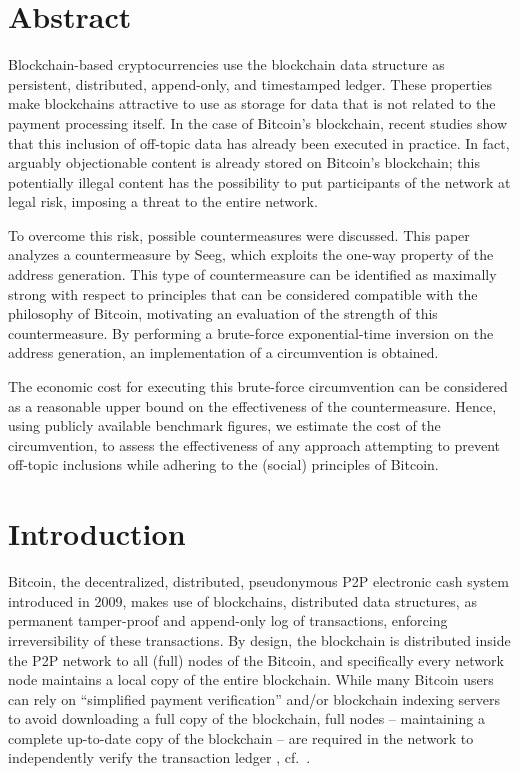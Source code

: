 \documentclass[a4paper,11pt,titlepage]{scrbook}
\newcommand{\blankpage}{
 \clearpage{\pagestyle{empty}\cleardoublepage}
}
\begin{document}
\frontmatter
{}

\setmarginsrb{3cm}{1cm}{3cm}{1cm}{6mm}{7mm}{5mm}{15mm}
\chapter*{Abstract}
Blockchain-based cryptocurrencies use the blockchain data structure as persistent, distributed, append-only, and timestamped ledger.
These properties make blockchains attractive to use as storage for data that is not related to the payment processing itself.
In the case of Bitcoin's blockchain, recent studies show that this inclusion of off-topic data has already been executed in practice.
In fact, arguably objectionable content is already stored on Bitcoin's blockchain;
this potentially illegal content has the possibility to put participants of the network at legal risk, imposing a threat to the entire network.

To overcome this risk, possible countermeasures were discussed. This paper analyzes a countermeasure by Seeg, which exploits the one-way property of the address generation.
This type of countermeasure can be identified as maximally strong with respect to principles that can be considered compatible with the philosophy of Bitcoin, motivating an evaluation of the strength of this countermeasure.
By performing a brute-force exponential-time inversion on the address generation, an implementation of a circumvention is obtained.

The economic cost for executing this brute-force circumvention can be considered as a reasonable upper bound on the effectiveness of the countermeasure.
Hence, using publicly available benchmark figures, we estimate the cost of the circumvention, to assess the effectiveness of any approach attempting to prevent off-topic inclusions while adhering to the (social) principles of Bitcoin.





\tableofcontents
\blankpage

\mainmatter
{}
\chapter{Introduction}

Bitcoin, the decentralized, distributed, pseudonymous P2P electronic cash system introduced in 2009, makes use of blockchains, distributed data structures, as permanent tamper-proof and append-only log of transactions, enforcing irreversibility of these transactions.
By design, the blockchain is distributed inside the P2P network to all (full) nodes of the Bitcoin, and specifically every network node maintains a local copy of the entire blockchain.
While many Bitcoin users can rely on \enquote{simplified payment verification} and/or blockchain indexing servers to avoid downloading a full copy of the blockchain, full nodes – maintaining a complete up-to-date copy of the blockchain – are required in the network to independently verify the transaction ledger \cite{nakamoto_bitcoin_2008}, cf.~\cite[Chap.~8–9]{antonopoulos_mastering_2017}.
\end{document}
